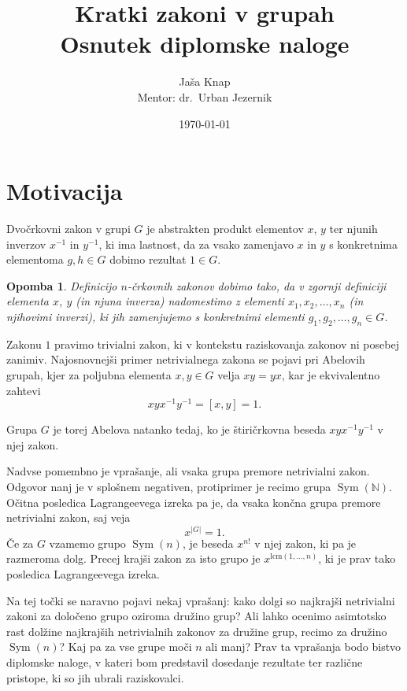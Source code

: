 \documentclass[12pt,a4paper]{article}
\title{Kratki zakoni v grupah \\ \large Osnutek diplomske naloge}
\author{Jaša Knap \\ \large Mentor: dr.~Urban Jezernik}
\date{\today}
\newcounter{theoremcounter}[section] %
\newtheorem{opomba}[theoremcounter]{Opomba}
\begin{document}
\maketitle

\section{Motivacija}

Dvočrkovni zakon v grupi $G$ je abstrakten produkt elementov $x$, $y$ ter njunih inverzov $x^{-1}$ in $y^{-1}$, ki ima lastnost, da za vsako zamenjavo $x$ in $y$ s konkretnima
elementoma $g, h \in G$ dobimo rezultat $1 \in G$. 

\begin{opomba}
Definicijo $n$-črkovnih zakonov dobimo tako, da v zgornji definiciji elementa $x$, $y$ (in njuna inverza) nadomestimo z elementi $x_1, x_2, \ldots, x_n$ (in njihovimi inverzi),
ki jih zamenjujemo s konkretnimi elementi $g_1, g_2, \ldots, g_{n} \in G$.
\end{opomba}

\noindent
Zakonu $1$ pravimo trivialni zakon, ki v kontekstu raziskovanja zakonov ni posebej zanimiv. Najosnovnejši primer netrivialnega zakona se pojavi pri Abelovih grupah, kjer za poljubna elementa $x,y \in  G$ velja $xy = yx$, kar je ekvivalentno
zahtevi \begin{equation*}
xyx^{-1}y^{-1} = [x,y] = 1.
\end{equation*}


\noindent
Grupa $G$ je torej Abelova natanko tedaj, ko je štiričrkovna beseda $xyx^{-1}y^{-1}$ v njej zakon. 

\noindent
Nadvse pomembno je vprašanje, ali vsaka grupa premore netrivialni zakon. Odgovor nanj je v splošnem negativen, protiprimer je recimo grupa $\operatorname{Sym}(\mathbb{N})$.
Očitna posledica Lagrangeevega izreka pa je, da vsaka končna grupa premore netrivialni zakon, saj veja \begin{equation*}
x^{\lvert G \rvert } = 1.
\end{equation*}  
Če za $G$ vzamemo grupo $\operatorname{Sym}(n)$, je beseda $x^{n!}$ v njej zakon, ki pa je razmeroma dolg. Precej krajši zakon za isto grupo je $x^{\text{lcm}(1, \ldots, n)}$, ki je prav tako posledica Lagrangeevega izreka. 

\noindent
Na tej točki se naravno pojavi nekaj vprašanj:
kako dolgi so najkrajši netrivialni zakoni za določeno grupo oziroma družino grup? Ali lahko ocenimo asimtotsko rast dolžine najkrajših netrivialnih zakonov za družine grup, recimo za družino $\operatorname{Sym}(n)$? Kaj pa za vse grupe moči $n$ ali manj?  Prav ta vprašanja bodo bistvo diplomske naloge,
v kateri bom predstavil dosedanje rezultate ter različne pristope, ki so jih ubrali raziskovalci.
\end{document}
